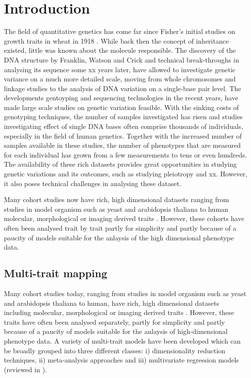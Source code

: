 \chapter{Introduction}

The field of quantitative genetics has come far since Fisher's initial studies on growth traits in wheat in 1918 \citep{}. While back then the concept of inheritance existed, little was known about the molecule responsible.  The discovery of the DNA structure by Franklin, Watson and Crick and technical break-throughs in analysing its sequence some xx years later, have allowed to investigate genetic variance on a much more detailed scale, moving from whole chromosomes and linkage studies to the analysis of DNA variation on a single-base pair level. The developments gentoyping and sequencing technologies in the recent years, have made large scale studies on genetic variation feasible. With the sinking costs of genotyping techniques, the number of samples investigated has risen and studies investigating effect of single DNA bases often comprise thousands of individuals, especially in the field of human genetics.  Together with the increased number of samples available in these studies, the number of phenotypes that are measured for each individual has grown from a few measurements to tens or even hundreds. The availability of these rich datasets provides great opportunities in studying genetic variations and its outcomes, such as studying pleiotropy and xx.  However, it also poses technical challenges in analysing these dataset. 

 Many cohort studies now have rich, high dimensional datasets ranging from studies in model organism such as yeast and arabidopsis thaliana to human molecular, morphological or imaging derived traits \citep{Bloom2013,Atwell2010,Astle2009,Shaffer2016,Stein2010}. However, these cohorts have often been analysed trait by trait partly for simplicity and partly because of a paucity of models suitable for the anlaysis of the high dimensional phenotype data.

\section{Multi-trait mapping}
Many cohort studies today, ranging from studies in model organism such as yeast and arabidopsis thaliana to human, have rich, high dimensional datasets including molecular, morphological or imaging derived traits \citep{Bloom2013,Atwell2010,Astle2009,Shaffer2016,Stein2010}. However, these traits have often been analysed separately,  partly for simplicity and partly because of a paucity of models suitable for the anlaysis of high-dimensional phenotype data. A variety of multi-trait models have been developed which can be broadly grouped into three different classes: i) dimensionality reduction techniques, ii) meta-analysis approaches and iii) multivariate regression models (reviewed in \citep{Shriner2012,Yang2012}). 
